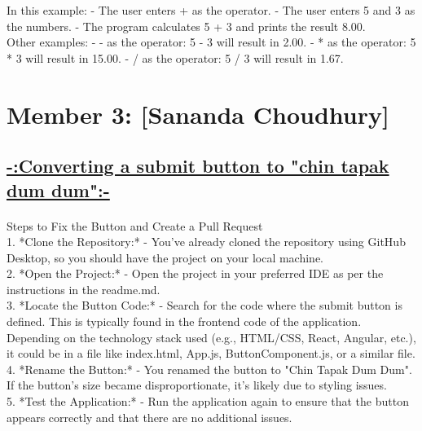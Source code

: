 \documentclass[a4paper,12pt]{article}
\begin{document}
In this example:
- The user enters + as the operator.
- The user enters 5 and 3 as the numbers.
- The program calculates 5 + 3 and prints the result 8.00.\\

Other examples:
- - as the operator: 5 - 3 will result in 2.00.
- * as the operator: 5 * 3 will result in 15.00.
- / as the operator: 5 / 3 will result in 1.67.

\newpage

\section*{Member 3: [Sananda Choudhury]}
\date{\today}
\FloatBarrier 
\begin{center}
\section*{\uline{-:Converting a submit button to "chin tapak dum dum":-}}
\end{center}
\paragraph{}

Steps to Fix the Button and Create a Pull Request\\

1. *Clone the Repository:*
   - You’ve already cloned the repository using GitHub Desktop, so you should have the project on your local machine.\\

2. *Open the Project:*
   - Open the project in your preferred IDE as per the instructions in the readme.md.\\

3. *Locate the Button Code:*
   - Search for the code where the submit button is defined. This is typically found in the frontend code of the application. Depending on the technology stack used (e.g., HTML/CSS, React, Angular, etc.), it could be in a file like index.html, App.js, ButtonComponent.js, or a similar file.\\

4. *Rename the Button:*
   - You renamed the button to "Chin Tapak Dum Dum". If the button’s size became disproportionate, it’s likely due to styling issues.\\

5. *Test the Application:*
   - Run the application again to ensure that the button appears correctly and that there are no additional issues.\\
\end{document}

